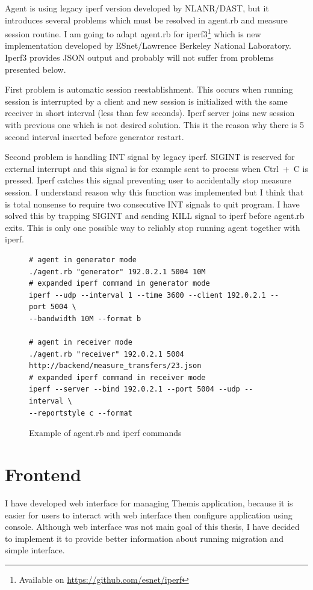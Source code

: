 Agent is using legacy iperf version developed by NLANR/DAST, but it introduces several problems which must be resolved in agent.rb and measure session routine. I am going to adapt agent.rb for iperf3\footnote{Available on \url{https://github.com/esnet/iperf}} which is new implementation developed by ESnet/Lawrence Berkeley National Laboratory. Iperf3 provides \Ac{JSON} output and probably will not suffer from problems presented below.

First problem is automatic session reestablishment. This occurs when running session is interrupted by a client and new session is initialized with the same receiver in short interval (less than few seconds). Iperf server joins new session with previous one which is not desired solution. This it the reason why there is 5 second interval inserted before generator restart. 

Second problem is handling INT signal by legacy iperf. SIGINT is reserved for external interrupt and this signal is for example sent to process when \mbox{Ctrl + C} is pressed. Iperf catches this signal preventing user to accidentally stop measure session. I understand reason why this function was implemented but I think that is total nonsense to require two consecutive INT signals to quit program. I have solved this by trapping SIGINT and sending KILL signal to iperf before agent.rb exits. This is only one possible way to reliably stop running agent together with iperf.

\begin{figure}[htb]
\caption{Example of agent.rb and iperf commands}
\label{code:fw}
\begin{verbatim}
# agent in generator mode
./agent.rb "generator" 192.0.2.1 5004 10M
# expanded iperf command in generator mode
iperf --udp --interval 1 --time 3600 --client 192.0.2.1 --port 5004 \
--bandwidth 10M --format b
	
# agent in receiver mode
./agent.rb "receiver" 192.0.2.1 5004 http://backend/measure_transfers/23.json
# expanded iperf command in receiver mode
iperf --server --bind 192.0.2.1 --port 5004 --udp --interval \
--reportstyle c --format
\end{verbatim}
\end{figure}



\section{Frontend}
I have developed web interface for managing Themis application, because it is easier for users to interact with web interface then configure application using console. Although web interface was not main goal of this thesis, I have decided to implement it to provide better information about running migration and simple interface.

